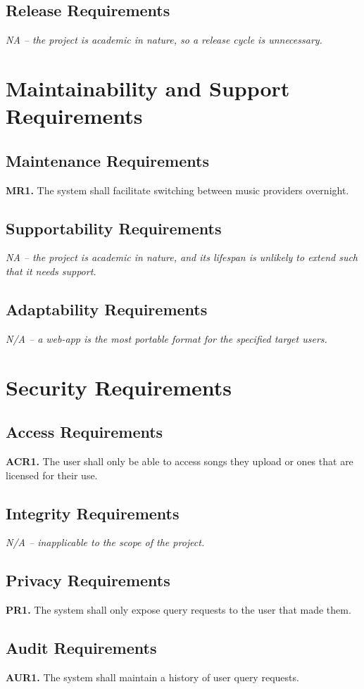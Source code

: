 \documentclass[12pt]{article}
\begin{document}
\subsection{Release Requirements}
\emph{NA -- the project is academic in nature, so a release cycle is unnecessary.}

\section{Maintainability and Support Requirements}
\subsection{Maintenance Requirements}
\textbf{MR1.} The system shall facilitate switching between music providers overnight.
\subsection{Supportability Requirements}
\emph{NA -- the project is academic in nature, and its lifespan is unlikely to extend such that it needs support.}
\subsection{Adaptability Requirements}
\emph{N/A -- a web-app is the most portable format for the specified target users.}

\section{Security Requirements}
\subsection{Access Requirements}
\textbf{ACR1.} The user shall only be able to access songs they upload or ones that are licensed for their use.
\subsection{Integrity Requirements}
\emph{N/A -- inapplicable to the scope of the project.}
\subsection{Privacy Requirements}
\textbf{PR1.} The system shall only expose query requests to the user that made them.
\subsection{Audit Requirements}
\textbf{AUR1.} The system shall maintain a history of user query requests.
\end{document}
